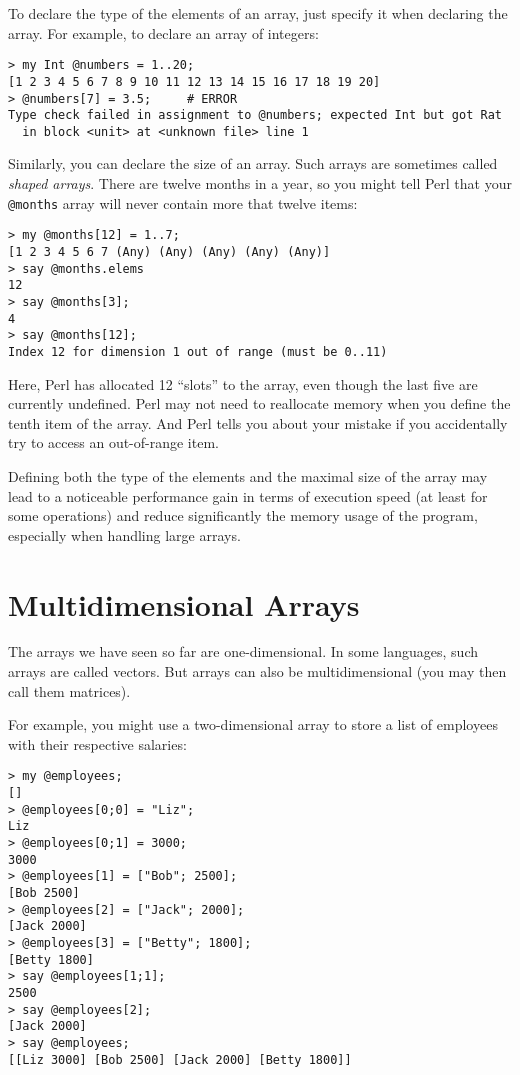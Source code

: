 To declare the type of the elements of an array, just 
specify it when declaring the array. For example, to 
declare an array of integers:

\begin{verbatim}
> my Int @numbers = 1..20;
[1 2 3 4 5 6 7 8 9 10 11 12 13 14 15 16 17 18 19 20]
> @numbers[7] = 3.5;     # ERROR
Type check failed in assignment to @numbers; expected Int but got Rat
  in block <unit> at <unknown file> line 1
\end{verbatim}
%

Similarly, you can declare the size of an array. Such arrays 
are sometimes called \emph{shaped arrays}. There are 
twelve months in a year, so you might tell Perl that your 
\verb'@months' array will never contain more that twelve 
items:
\begin{verbatim}
> my @months[12] = 1..7;
[1 2 3 4 5 6 7 (Any) (Any) (Any) (Any) (Any)]
> say @months.elems
12
> say @months[3];
4
> say @months[12];
Index 12 for dimension 1 out of range (must be 0..11)
\end{verbatim}
%

Here, Perl has allocated 12 ``slots'' to the array, even though 
the last five are currently undefined. Perl may not need 
to reallocate memory when you define the tenth item of 
the array. And Perl tells you about your mistake if you 
accidentally try to access an out-of-range item.

Defining both the type of the elements and the maximal size 
of the array may lead to a noticeable performance gain 
in terms of execution speed (at least for some operations) 
and reduce significantly the memory usage of the program, 
especially when handling large arrays.

\section{Multidimensional Arrays}
\label{multidimensional_array}

The arrays we have seen so far are one-dimensional. In some 
languages, such arrays are called vectors. But arrays can 
also be multidimensional (you may then call them matrices).

For example, you might use a two-dimensional array to 
store a list of employees with their respective salaries:

\begin{verbatim}
> my @employees;
[]
> @employees[0;0] = "Liz";
Liz
> @employees[0;1] = 3000;
3000
> @employees[1] = ["Bob"; 2500];
[Bob 2500]
> @employees[2] = ["Jack"; 2000];
[Jack 2000]
> @employees[3] = ["Betty"; 1800];
[Betty 1800]
> say @employees[1;1];
2500
> say @employees[2];
[Jack 2000]
> say @employees;
[[Liz 3000] [Bob 2500] [Jack 2000] [Betty 1800]]
\end{verbatim}

